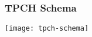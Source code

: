 \begin{frame}
\frametitle{TPCH Schema}
\begin{center}
\texttt{[image: tpch-schema]}
\end{center}
\end{frame}

